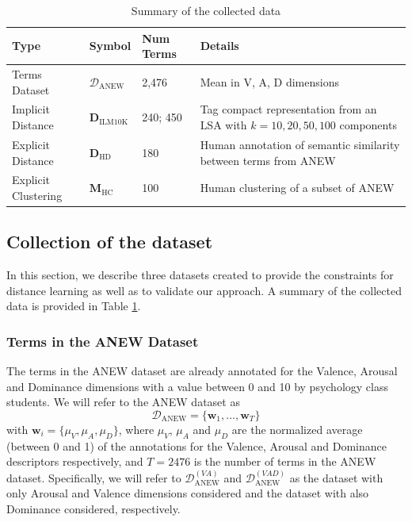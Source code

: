 \begin{table}[tb]
\caption{Summary of the collected data}
\label{tab:ANEWdata}
\begin{center}
\bgroup
\def\arraystretch{1.5}
\begin{tabular}{ ||p{} |l |p{}  |p{}||}
\hline
\hline
Type &  Symbol & Num Terms & Details \\
\hline
\hline
Terms Dataset  &$\mathcal{D}_{\text{ANEW}} $ %
& 2,476 & Mean in V, A, D dimensions\\
\hline
Implicit Distance  &$\mathbf{D}_{\text{ILM10K}}$& 240; 450 & Tag compact representation from an LSA with $k=10,20,50,100$ components\\
\hline
Explicit Distance  & $\mathbf{D}_{\text{HD}} $ & 180 & Human annotation of semantic similarity between terms from ANEW\\
\hline
Explicit Clustering  & $\mathbf{M}_{\text{HC}} $ & 100 & Human clustering of a subset of ANEW\\
\hline
\hline
\end{tabular}\quad
\egroup
\end{center}
\end{table}


\subsection{Collection of the dataset}\label{sec:ANEW:data}
In this section, we describe three datasets created to provide the constraints for distance learning as well as to validate our approach. A summary of the collected data is provided in Table \ref{tab:ANEWdata}.

\subsubsection{Terms in the ANEW Dataset}
The terms in the ANEW dataset \cite{Bradley1999} are already annotated for the Valence, Arousal and Dominance dimensions with a value between 0 and 10 by psychology class students. We will refer to the ANEW dataset as
\begin{equation}
\mathcal{D}_{\text{ANEW}}=\{\mathbf{w}_1, ..., \mathbf{w}_T\}
\label{eq:ANEW:ANEW}
\end{equation} 
with $\mathbf{w}_i=\{\mu_V, \mu_A, \mu_D \}$, where $\mu_V$, $\mu_A$ and $\mu_D$ are the normalized average (between 0 and 1) of the annotations for the Valence, Arousal and Dominance descriptors respectively, and $T=2476$ is the number of terms in the ANEW dataset.  Specifically, we will refer to $\mathcal{D}_{\text{ANEW}}^{(VA)}$ and $\mathcal{D}_{\text{ANEW}}^{(VAD)}$ as the dataset with only Arousal and Valence dimensions considered and the dataset with also Dominance considered, respectively. 

